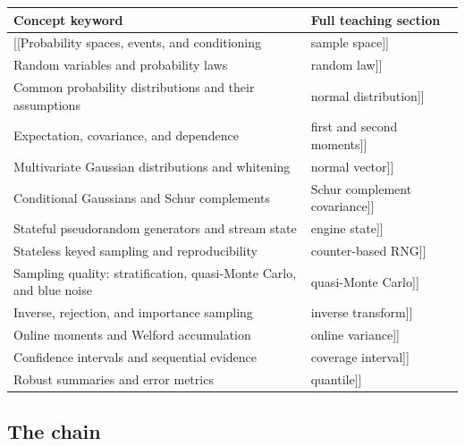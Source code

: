 {\def\LTcaptype{none} %
\begin{longtable}[]{@{}
  >{\raggedright\arraybackslash}p{}
  >{\raggedright\arraybackslash}p{}@{}}
\toprule\noalign{}
\begin{minipage}[b]{\linewidth}\raggedright
Concept keyword
\end{minipage} & \begin{minipage}[b]{\linewidth}\raggedright
Full teaching section
\end{minipage} \\
\midrule\noalign{}
\endhead
\bottomrule\noalign{}
\endlastfoot
{[}{[}Probability spaces, events, and conditioning & sample space{]}{]} \\
{[}{[}Random variables and probability laws & random law{]}{]} \\
{[}{[}Common probability distributions and their assumptions & normal distribution{]}{]} \\
{[}{[}Expectation, covariance, and dependence & first and second moments{]}{]} \\
{[}{[}Multivariate Gaussian distributions and whitening & normal vector{]}{]} \\
{[}{[}Conditional Gaussians and Schur complements & Schur complement covariance{]}{]} \\
{[}{[}Stateful pseudorandom generators and stream state & engine state{]}{]} \\
{[}{[}Stateless keyed sampling and reproducibility & counter-based RNG{]}{]} \\
{[}{[}Sampling quality: stratification, quasi-Monte Carlo, and blue noise & quasi-Monte Carlo{]}{]} \\
{[}{[}Inverse, rejection, and importance sampling & inverse transform{]}{]} \\
{[}{[}Online moments and Welford accumulation & online variance{]}{]} \\
{[}{[}Confidence intervals and sequential evidence & coverage interval{]}{]} \\
{[}{[}Robust summaries and error metrics & quantile{]}{]} \\
\end{longtable}
}

\subsection{The chain}\label{the-chain}

